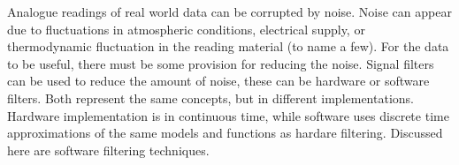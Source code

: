 \documentclass[twoside,a4]{report}
\def\br{\newline \newline \noindent}
\begin{document}
Analogue readings of real world data can be corrupted by noise. Noise can appear due to fluctuations in atmospheric conditions, electrical supply, or thermodynamic fluctuation in the reading material (to name a few). For the data to be useful, there must be some provision for reducing the noise. Signal filters can be used to reduce the amount of noise, these can be hardware or software filters. Both represent the same concepts, but in different implementations. Hardware implementation is in continuous time, while software uses discrete time approximations of the same models and functions as hardare filtering. Discussed here are software filtering techniques. \br



\end{document}
